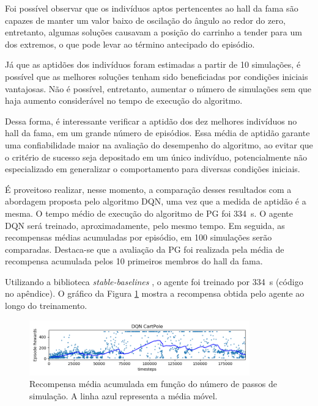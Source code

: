 Foi possível observar que os indivíduos aptos pertencentes ao hall da fama são capazes de manter um valor baixo de oscilação do ângulo ao redor do zero, entretanto, algumas soluções causavam a posição do carrinho a tender para um dos extremos, o que pode levar ao término antecipado do episódio. 

Já que as aptidões dos indivíduos foram estimadas a partir de 10 simulações, é possível que as melhores soluções tenham sido beneficiadas por condições iniciais vantajosas. Não é possível, entretanto, aumentar o número de simulações sem que haja aumento considerável no tempo de execução do algoritmo.

Dessa forma, é interessante verificar a aptidão dos dez melhores indivíduos no hall da fama, em um grande número de episódios. Essa média de aptidão garante uma confiabilidade maior na avaliação do desempenho do algoritmo, ao evitar que o critério de sucesso seja depositado em um único indivíduo, potencialmente não especializado em generalizar o comportamento para diversas condições iniciais.

É proveitoso realizar, nesse momento, a comparação desses resultados com a abordagem proposta pelo algoritmo DQN, uma vez que a medida de aptidão é a mesma. O tempo médio de execução do algoritmo de PG foi \SI{334}{s}. O agente DQN será treinado, aproximadamente, pelo mesmo tempo. Em seguida, as recompensas médias acumuladas por episódio, em 100 simulações serão comparadas. Destaca-se que a avaliação da PG foi realizada pela média de recompensa acumulada pelos 10 primeiros membros do hall da fama.

Utilizando a biblioteca \textit{stable-baselines} \cite{stable-baselines}, o agente foi treinado por \SI{334}{s} (código no apêndice). O gráfico da Figura \ref{fig:4ec-cartpoledqndiverg} mostra a recompensa obtida pelo agente ao longo do treinamento.

\begin{figure}[H]
	\centering
	\includegraphics[width=0.85\textwidth]{02_desenvolvimento/04_EC_Fig_CartpoleDQNDiverg.png}
	\caption{Recompensa média acumulada em função do número de passos de simulação. A linha azul representa a média móvel.}
	\label{fig:4ec-cartpoledqndiverg}
\end{figure}

